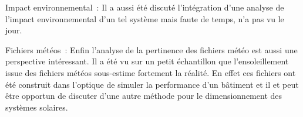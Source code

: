 Impact environnemental~:
Il a aussi été discuté l’intégration d’une analyse de l’impact environnemental
d’un tel système mais faute de temps, n’a pas vu le jour.

Fichiers météos~:
Enfin l’analyse de la pertinence des fichiers météo est aussi une perspective intéressant.
Il a été vu sur un petit échantillon que l’ensoleillement issue des fichiers météos
sous-estime fortement la réalité. En effet ces fichiers ont été construit dans l’optique
de simuler la performance d’un bâtiment et il et peut être opportun de discuter d’une
autre méthode pour le dimensionnement des systèmes solaires.
